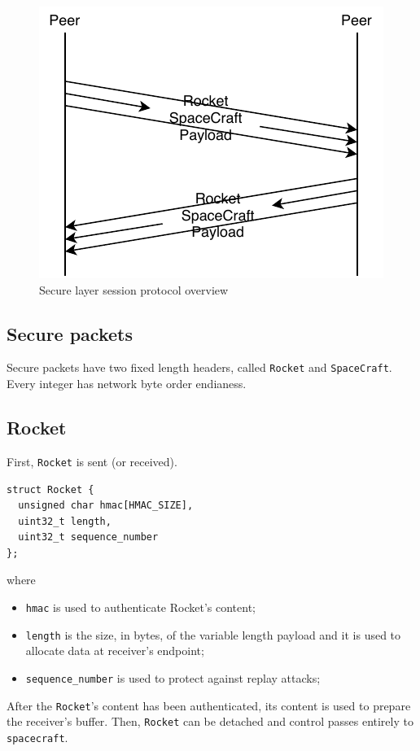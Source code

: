 \documentclass[a4paper,12pt]{article}
\begin{document}
\begin{figure}[H]
\centering
\includegraphics{img/secure-session-protocol.pdf}
\caption{Secure layer session protocol overview}
\end{figure}

\subsection{Secure packets}
Secure packets have two fixed length headers, called \texttt{Rocket} and \texttt{SpaceCraft}.
Every integer has network byte order endianess.

\subsection{Rocket}
First, \texttt{Rocket} is sent (or received).

\begin{verbatim}
struct Rocket {
  unsigned char hmac[HMAC_SIZE],
  uint32_t length,
  uint32_t sequence_number
};
\end{verbatim}

where

\begin{itemize}
  \item \texttt{hmac} is used to authenticate Rocket's content;
  \item \texttt{length} is the size, in bytes, of the variable length payload and it is used to allocate data at receiver's endpoint;
  \item \texttt{sequence\_number} is used to protect against replay attacks;
\end{itemize}

After the \texttt{Rocket}'s content has been authenticated, its content is used to prepare the receiver's buffer.
Then, \texttt{Rocket} can be detached and control passes entirely to \texttt{spacecraft}.
\end{document}
